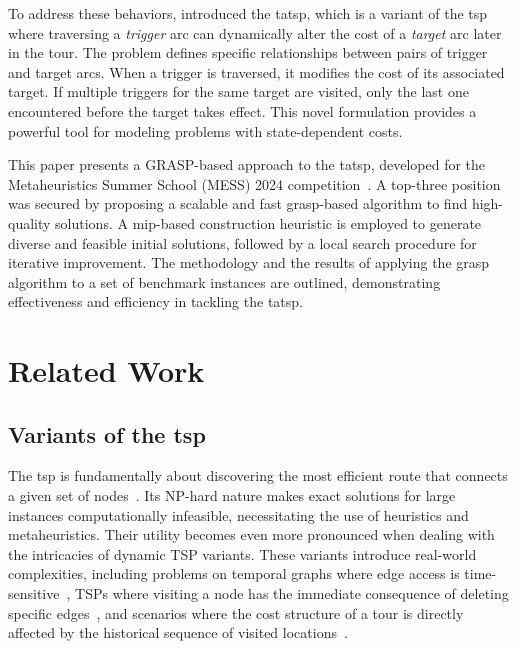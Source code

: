 \documentclass[twocolumn]{article} %
\begin{document}
To address these behaviors, \citet{Cerrone} introduced the \gls{tatsp}, which is a variant of the \gls{tsp} where traversing a \textit{trigger} arc can dynamically alter the cost of a \textit{target} arc later in the tour. 
The problem defines specific relationships between pairs of trigger and target arcs. 
When a trigger is traversed, it modifies the cost of its associated target. 
If multiple triggers for the same target are visited, only the last one encountered before the target takes effect. 
This novel formulation provides a powerful tool for modeling problems with state-dependent costs.

This paper presents a GRASP-based approach to the \gls{tatsp}, developed for the Metaheuristics Summer School (MESS) 2024 competition~\cite{mess2024}. 
A top-three position was secured by proposing a scalable and fast \gls{grasp}-based algorithm to find high-quality solutions. 
A \gls{mip}-based construction heuristic is employed to generate diverse and feasible initial solutions, followed by a local search procedure for iterative improvement.
The methodology and the results of applying the \gls{grasp} algorithm to a set of benchmark instances are outlined, demonstrating effectiveness and efficiency in tackling the \gls{tatsp}.

\section{Related Work}
\label{sec:related_work}

\subsection{Variants of the \gls{tsp}}

The \gls{tsp} is fundamentally about discovering the most efficient route that connects a given set of nodes~\cite{Applegate2011}. 
Its NP-hard nature makes exact solutions for large instances computationally infeasible, necessitating the use of heuristics and metaheuristics.
Their utility becomes even more pronounced when dealing with the intricacies of dynamic TSP variants.
These variants introduce real-world complexities, including problems on temporal graphs where edge access is time-sensitive~\cite{timedependenttsp}, 
TSPs where visiting a node has the immediate consequence of deleting specific edges~\cite{traversaldependenttsp}, and scenarios where the cost structure of a tour is directly affected by the historical sequence of visited locations~\cite{Bossek2020}.
\end{document}
